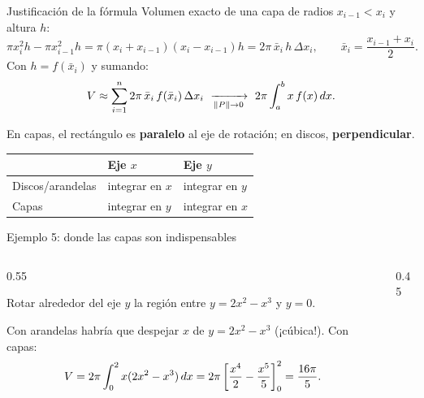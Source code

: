 \documentclass[10pt,aspectratio=169]{beamer}
\begin{document}
\begin{frame}{Justificación de la fórmula}
  Volumen exacto de una capa de radios $x_{i-1}<x_i$ y altura $h$:
  \[ \pi x_i^2h-\pi x_{i-1}^2h=\pi(x_i+x_{i-1})(x_i-x_{i-1})h=2\pi\,\bar x_i\,h\,\Delta x_i,\qquad \bar x_i=\frac{x_{i-1}+x_i}2. \]
  Con $h=f(\bar x_i)$ y sumando:
  \[ V\approx\sum_{i=1}^n2\pi\,\bar x_i\,f(\bar x_i)\,\Delta x_i\ \xrightarrow[\|P\|\to0]{}\ 2\pi\int_a^bx\,f(x)\dx. \]
  \begin{idea}
    En capas, el rectángulo es \textbf{paralelo} al eje de rotación; en discos, \textbf{perpendicular}.
  \end{idea}
  \begin{center}
    \renewcommand{\arraystretch}{1.3}
    \begin{tabular}{l|l|l}
      & Eje $x$ & Eje $y$\\ \hline
      Discos/arandelas & integrar en $x$ & integrar en $y$\\
      Capas & integrar en $y$ & integrar en $x$
    \end{tabular}
  \end{center}
\end{frame}

\begin{frame}{Ejemplo 5: donde las capas son indispensables}
  \begin{columns}
    \begin{column}{0.55\textwidth}
      \begin{ejemplo}
        Rotar alrededor del eje $y$ la región entre $y=2x^2-x^3$ y $y=0$.

        Con arandelas habría que despejar $x$ de $y=2x^2-x^3$ (¡cúbica!). Con capas:
        \[ V=2\pi\int_0^2x(2x^2-x^3)\,dx=2\pi\left[\frac{x^4}{2}-\frac{x^5}{5}\right]_0^2=\frac{16\pi}{5}. \]
      \end{ejemplo}
    \end{column}
    \begin{column}{0.45\textwidth}
      \centering
    \end{column}
  \end{columns}
\end{frame}
\end{document}
